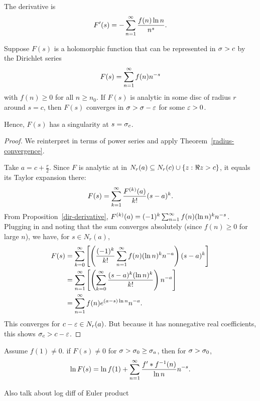 \begin{pr}[Derivatives]
The derivative is
\[
F'(s)=-\sum_{n=1}^{\infty} \frac{f(n)\ln n}{n^s}.
\]
\end{pr}
\begin{thm}[Landau]
Suppose $F(s)$ is a holomorphic function that can be represented in $\sigma>c$ by the Dirichlet series
\[
F(s)=\sum_{n=1}^{\infty} f(n)n^{-s}\]
with $f(n)\ge 0$ for all $n\ge n_0$. If $F(s)$ is analytic in some disc of radius $r$ around $s=c$, then $F(s)$ converges in $\sigma>\sigma-\varepsilon$ for some $\varepsilon>0$.

Hence, $F(s)$ has a singularity at $s=\sigma_c$.
\end{thm}
\begin{proof}
We reinterpret in terms of power series and apply Theorem~\ref{radius-convergence}. %

Take $a=c+\frac{r}{2}$.
Since $F$ is analytic at in $N_{r}(a)\subseteq N_{r}(c)\cup \left\{{z}:{\Re z>c}\right\}$, it equals its Taylor expansion there: %
\[
F(s)=\sum_{k=1}^{\infty} \frac{F^{(k)}(a)}{k!}(s-a)^k.
\]
From Proposition~\ref{dir-derivative}, $F^{(k)}(a)=(-1)^k\sum_{n=1}^{\infty} f(n)(\ln n)^k n^{-s}$. Plugging in and noting that the sum converges absolutely (since $f(n)\ge 0$ for large $n$), we have, for $s\in N_{r}(a)$,
\begin{align*}
F(s)&=\sum_{k=0}^{\infty}\left[ {\left( {\frac{(-1)^k}{k!}\sum_{n=1}^{\infty} f(n)(\ln n)^k n^{-a}} \right)(s-a)^k} \right]\\
&=\sum_{n=1}^{\infty} \left[ {\left( {\sum_{k=0}^{\infty}\frac{(s-a)^k(\ln n)^k}{k!}} \right)n^{-a}} \right]\\
&=\sum_{n=1}^{\infty}f(n)e^{(a-s)\ln n}n^{-a}.
\end{align*}
This converges for $c-\varepsilon\in N_r(a)$. But because it has nonnegative real coefficients, this shows $\sigma_c>c-\varepsilon$.
\end{proof}
\begin{pr}[Logarithms]
Assume $f(1)\ne 0$. if $F(s)\ne 0$ for $\sigma>\sigma_0\ge \sigma_a$, then for $\sigma>\sigma_0$,
\[
\ln F(s)=\ln f(1)+\sum_{n=1}^{\infty} \frac{f'*f^{-1}(n)}{\ln n}n^{-s}.
\]
\end{pr}
Also talk about log diff of Euler product
